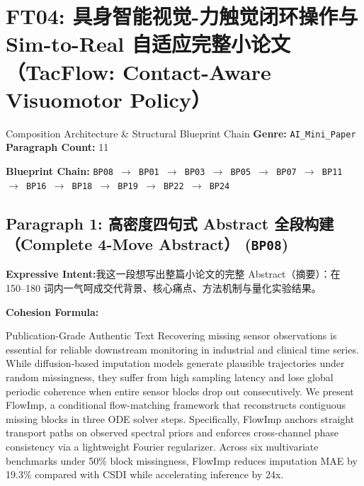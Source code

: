 \section{FT04: 具身智能视觉-力触觉闭环操作与 Sim-to-Real 自适应完整小论文（TacFlow: Contact-Aware Visuomotor Policy）}\label{comp:FT04}
\begin{ConceptBox}{Composition Architecture \& Structural Blueprint Chain}
\textbf{Genre:} \texttt{AI\_Mini\_Paper} \quad \textbf{Paragraph Count:} 11\par
\textbf{Blueprint Chain:} \texttt{BP08 $\to$ BP01 $\to$ BP03 $\to$ BP05 $\to$ BP07 $\to$ BP11 $\to$ BP16 $\to$ BP18 $\to$ BP19 $\to$ BP22 $\to$ BP24}
\end{ConceptBox}
\subsection*{Paragraph 1: 高密度四句式 Abstract 全段构建（Complete 4-Move Abstract） (\texttt{BP08})}
\noindent\textbf{Expressive Intent:}\enspace 我这一段想写出整篇小论文的完整 Abstract（摘要）：在 150--180 词内一气呵成交代背景、核心痛点、方法机制与量化实验结果。\par
\noindent\textbf{Cohesion Formula:}\par\vspace{4pt}
\begin{ExampleBox}{Publication-Grade Authentic Text}
Recovering missing sensor observations is essential for reliable downstream monitoring in industrial and clinical time series. While diffusion-based imputation models generate plausible trajectories under random missingness, they suffer from high sampling latency and lose global periodic coherence when entire sensor blocks drop out consecutively. We present FlowImp, a conditional flow-matching framework that reconstructs contiguous missing blocks in three ODE solver steps. Specifically, FlowImp anchors straight transport paths on observed spectral priors and enforces cross-channel phase consistency via a lightweight Fourier regularizer. Across six multivariate benchmarks under 50\% block missingness, FlowImp reduces imputation MAE by 19.3\% compared with CSDI while accelerating inference by 24x.
\end{ExampleBox}
